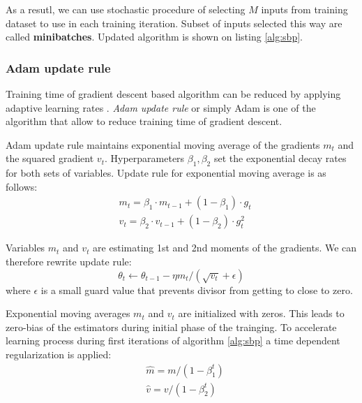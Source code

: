 As a resutl, we can use stochastic procedure of selecting $M$ inputs from training dataset to use in each training iteration.
Subset of inputs selected this way are called \textbf{minibatches}. Updated algorithm is shown on listing \ref{alg:sbp}.



\subsubsection{Adam update rule}

Training time of gradient descent based algorithm can be reduced by applying adaptive learning rates \cite{Kingma2015}.
\textit{Adam update rule} or simply Adam is one of the algorithm that allow to reduce training time of gradient descent.

Adam update rule maintains exponential moving average of the gradients $m_t$ and the squared gradient $v_t$.
Hyperparameters $\beta_1, \beta_2$ set the exponential decay rates for both sets of variables.
Update rule for exponential moving average is as follows:
\begin{equation*}
  \begin{aligned}
    & m_t = \beta_1 \cdot m_{t-1} + (1-\beta_1) \cdot g_t \\
    & v_t = \beta_2 \cdot v_{t-1} + (1-\beta_2) \cdot g_t^2
  \end{aligned}
\end{equation*}

Variables $m_t$ and $v_t$ are estimating 1st and 2nd moments of the gradients.
We can therefore rewrite update rule:
\begin{equation}
  \theta_t \gets \theta_{t-1} - \eta m_t / (\sqrt{v_t} + \epsilon)
\end{equation}
where $\epsilon$ is a small guard value that prevents divisor from getting to close to zero.

Exponential moving averages $m_t$ and $v_t$ are initialized with zeros.
This leads to zero-bias of the estimators during initial phase of the trainging.
To accelerate learning process during first iterations of algorithm \ref{alg:sbp} a time dependent regularization is applied:
\begin{equation*}
  \begin{aligned}
    & \hat{m} = m / (1-\beta_1^t) \\
    & \hat{v} = v/(1-\beta_2^t)
  \end{aligned}
\end{equation*}

